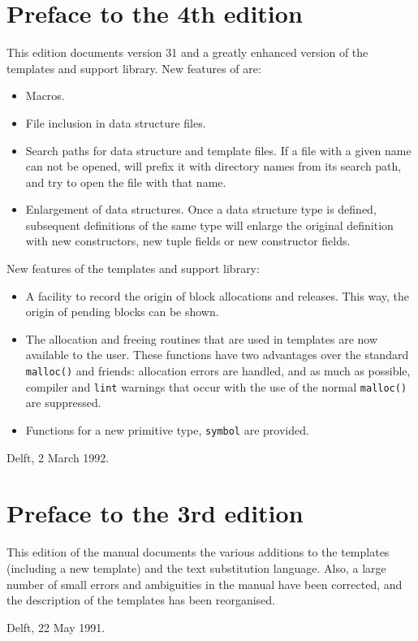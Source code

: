 \section{Preface to the 4th edition}
This edition documents {\Tm} version 31 and a greatly enhanced version
of the {\C} templates and support library.
New features of {\Tm} are:
\begin{itemize}
\item Macros. 
\item File inclusion in data structure files.
\item Search paths for data structure and template files. If a file with
      a given name can not be opened, {\Tm} will prefix it with
      directory names from its search path, and try to open the
      file with that name.
\item Enlargement of data structures. Once a data structure type is defined,
      subsequent definitions of the same type will enlarge the original
      definition with new constructors, new tuple fields or new constructor
      fields.
\end{itemize}
\par
New features of the {\Tm} {\C} templates and support library:
\begin{itemize}
\item A facility to record the origin of {\Tm} block allocations and
      releases. This way, the origin of pending blocks can be shown.
\item The allocation and freeing routines that are used in {\Tm} templates
      are now available to the user. These functions have two advantages
      over the standard \verb+malloc()+ and friends:
      allocation errors are handled,
      and as much as possible, compiler and \verb+lint+ warnings that
      occur with the use of the normal \verb+malloc()+ are suppressed.
\item Functions for a new primitive type, \verb+symbol+ are 
      provided.
\end{itemize}
\begin{flushright}
Delft, 2 March 1992.
\end{flushright}
\section{Preface to the 3rd edition}
This edition of the {\Tm} manual documents the various additions
to the {\C} templates (including a new template)
and the {\Tm} text substitution language.
Also, a large number of small errors and ambiguities in the manual
have been corrected,
and the description of the {\C} templates has been reorganised.
\begin{flushright}
Delft, 22 May 1991.
\end{flushright}
